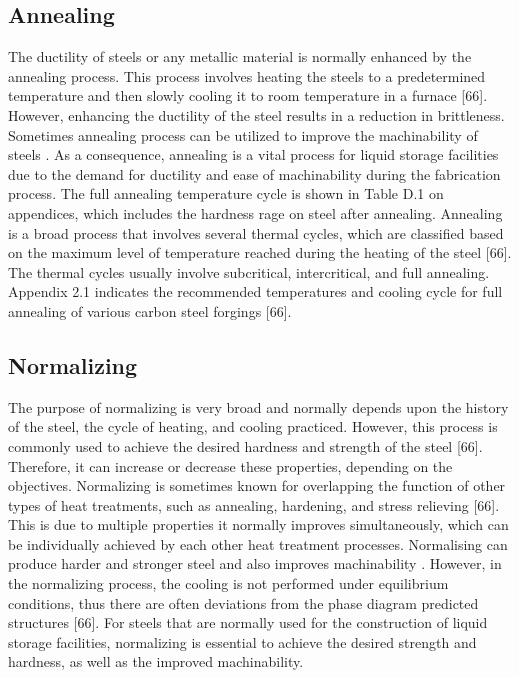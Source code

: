 \documentclass[12pt]{report}
\begin{document}
\subsection{Annealing}
The ductility of steels or any metallic material is normally enhanced by the annealing process. This process involves heating the steels to a predetermined temperature and then slowly cooling it to room temperature in a furnace [66]. However, enhancing the ductility of the steel results in a reduction in brittleness. Sometimes annealing process can be utilized to improve the machinability of steels \cite{nikkhah2019improved}. As a consequence, annealing is a vital process for liquid storage facilities due to the demand for ductility and ease of machinability during the fabrication process. The full annealing temperature cycle is shown in Table D.1 on appendices, which includes the hardness rage on steel after annealing. 
Annealing is a broad process that involves several thermal cycles, which are classified based on the maximum level of temperature reached during the heating of the steel [66]. The thermal cycles usually involve subcritical, intercritical, and full annealing. Appendix 2.1 indicates the recommended temperatures and cooling cycle for full annealing of various carbon steel forgings [66]. 

\subsection{Normalizing}
The purpose of normalizing is very broad and normally depends upon the history of the steel, the cycle of heating, and cooling practiced. However, this process is commonly used to achieve the desired hardness and strength of the steel [66]. Therefore, it can increase or decrease these properties, depending on the objectives. 
Normalizing is sometimes known for overlapping the function of other types of heat treatments, such as annealing, hardening, and stress relieving [66]. This is due to multiple properties it normally improves simultaneously, which can be individually achieved by each other heat treatment processes. Normalising can produce harder and stronger steel and also improves machinability \cite{mampuya2021effect}. However, in the normalizing process, the cooling is not performed under equilibrium conditions, thus there are often deviations from the phase diagram predicted structures [66].  For steels that are normally used for the construction of liquid storage facilities, normalizing is essential to achieve the desired strength and hardness, as well as the improved machinability.
\end{document}
